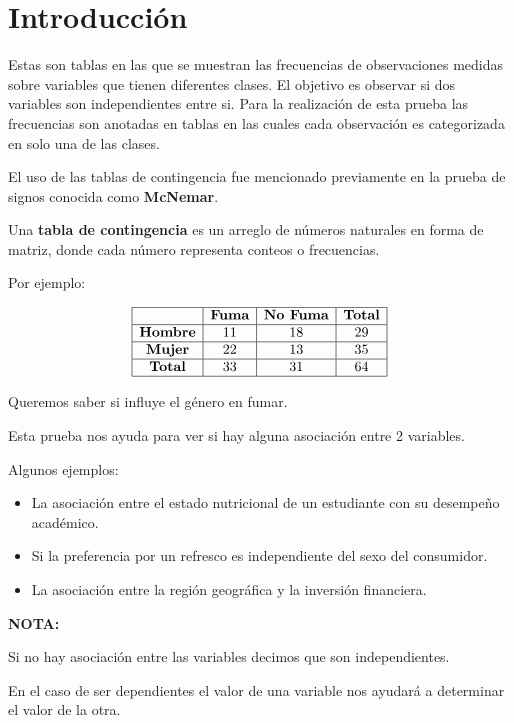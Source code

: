 \documentclass[
  a4paper,
  oneside,
  openany]{book}
\begin{document}
\hypertarget{introducciuxf3n-3}{%
\chapter*{Introducción}\label{introducciuxf3n-3}}


Estas son tablas en las que se muestran las frecuencias de observaciones medidas sobre variables que tienen diferentes clases. El objetivo es observar si dos variables son independientes entre si. Para la realización de esta prueba las frecuencias son anotadas en tablas en las cuales cada observación es categorizada en solo una de las clases.

El uso de las tablas de contingencia fue mencionado previamente en la prueba de signos conocida como \textbf{McNemar}.

Una \textbf{tabla de contingencia} es un arreglo de números naturales en forma de matriz, donde cada número representa conteos o frecuencias.

Por ejemplo:

\[
\begin{array}{|c|c|c|c|} 
\hline
&\textbf{Fuma} &\textbf{No Fuma} &\textbf{Total}\\
\hline
\textbf{Hombre} &11 &18 &29\\
\hline
\textbf{Mujer} &22 &13 &35\\
\hline
\textbf{Total}& 33& 31 &64\\
\hline
\end{array}
\]

Queremos saber si influye el género en fumar.

Esta prueba nos ayuda para ver si hay alguna asociación entre 2 variables.

Algunos ejemplos:

\begin{itemize}
\item
  La asociación entre el estado nutricional de un estudiante con su desempeño académico.
\item
  Si la preferencia por un refresco es independiente del sexo del consumidor.
\item
  La asociación entre la región geográfica y la inversión financiera.
\end{itemize}

\textbf{NOTA:}

Si no hay asociación entre las variables decimos que son independientes.

En el caso de ser dependientes el valor de una variable nos ayudará a determinar el valor de la otra.
\end{document}
